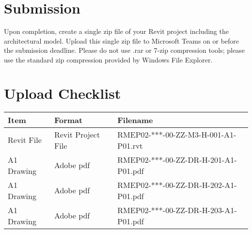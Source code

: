 \section*{Submission}
Upon completion, create a single zip file of your Revit project including the architectural model. Upload this single zip file to Microsoft Teams on or before the submission deadline.  Please do not use .rar or 7-zip compression tools; please use the standard zip compression provided by Windows File Explorer.

\section*{Upload Checklist}

\begin{tabular}{|l|l|l|}
	\hline
	\textbf{Item} & \textbf{Format} & \textbf{Filename} \\
	\hline
	Revit File  & Revit Project File & RMEP02-***-00-ZZ-M3-H-001-A1-P01.rvt  \\
	A1 Drawing  & Adobe pdf & RMEP02-***-00-ZZ-DR-H-201-A1-P01.pdf  \\
	A1 Drawing  & Adobe pdf & RMEP02-***-00-ZZ-DR-H-202-A1-P01.pdf  \\
	A1 Drawing  & Adobe pdf & RMEP02-***-00-ZZ-DR-H-203-A1-P01.pdf  \\
	\hline
\end{tabular}



